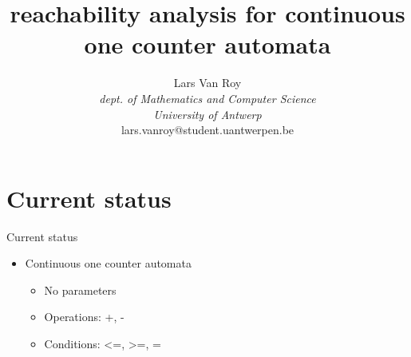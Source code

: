 \documentclass[10pt]{beamer}
\title{reachability analysis for continuous one counter automata}
\author{Lars Van Roy\\
\textit{dept. of Mathematics and Computer Science} \\
\textit{University of Antwerp}\\
lars.vanroy@student.uantwerpen.be}
\begin{document}
\maketitle

\section{Current status}

\begin{frame}{Current status}
	\begin{itemize}
	    \item Continuous one counter automata
	    \begin{itemize}
	    	\pause
	    	\item No parameters
	    	\pause
	    	\item Operations: +, -
	    	\pause
	    	\item Conditions: <=, >=, =
	    \end{itemize}
	\end{itemize}
\end{frame}
\end{document}
